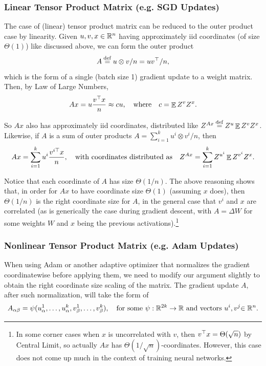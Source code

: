 \documentclass{article}
\theoremstyle{definition}
\DeclareMathOperator*{\EV}{\mathbb{E}}
\begin{document}
    \subsubsection{Linear Tensor Product Matrix (e.g. SGD Updates)}
    
    The case of (linear) tensor product matrix can be reduced to the outer product case by linearity. Given $u,v,x\in\mathbb{R}^{n}$ having approximately iid coordinates (of size $\Theta(1)$) like discussed above, we can form the outer product 
    \begin{equation}
    A\defeq u\otimes v/n=uv^{\trsp}/n,\label{eq:linearTensorA}
    \end{equation}
    which is the form of a single (batch size 1) gradient update to a weight matrix. Then, by Law of Large Numbers,
    \[
    Ax=u\frac{v^{\trsp}x}{n}\approx cu,\quad\text{where}\quad c=\EV Z^{v}Z^{x}.
    \]
    
    So $Ax$ also has approximately iid coordinates, distributed like $Z^{Ax}\defeq Z^{u}\EV Z^{v}Z^{x}$. Likewise, if $A$ is a sum of outer products $A=\sum_{i=1}^{k}u^{i}\otimes v^{i}/n$, then 
    \[
    Ax=\sum_{i=1}^{k}u^{i}\frac{v^{i\trsp}x}{n},\quad\text{with coordinates distributed as}\quad Z^{Ax}=\sum_{i=1}^{k}Z^{u^{i}}\EV Z^{v^{i}}Z^{x}.
    \]
    
    Notice that each coordinate of $A$ has size $\Theta(1/n)$. The above reasoning shows that, in order for $Ax$ to have coordinate size $\Theta(1)$ (assuming $x$ does), then $\Theta(1/n)$ is the right coordinate size for $A$, in the general case that $v^{i}$ and $x$ are correlated (as is generically the case during gradient descent, with $A=\Delta W$ for some weights $W$ and $x$ being the previous activations).\footnote{In some corner cases when $x$ is uncorrelated with $v$, then $v^{\top}x=\Theta(\sqrt{n})$ by Central Limit, so actually $Ax$ has $\Theta(1/\sqrt{n})$-coordinates. However, this case does not come up much in the context of training neural networks.}
    
    \subsubsection{Nonlinear Tensor Product Matrix (e.g. Adam Updates)}
    
    When using Adam or another adaptive optimizer that normalizes the gradient coordinatewise before applying them, we need to modify our argument slightly to obtain the right coordinate size scaling of the matrix. The gradient update $A$, after such normalization, will take the form of
    \begin{equation}
    A_{\alpha\beta}=\psi(u_{\alpha}^{1},\ldots,u_{\alpha}^{k},v_{\beta}^{1},\ldots,v_{\beta}^{k}),\quad\text{for some \ensuremath{\psi:\R^{2k}\to\R} and vectors \ensuremath{u^{i},v^{j}}\ensuremath{\in\R^{n}}.}\label{eq:nonlineartensor}
    \end{equation}
    
\end{document}
